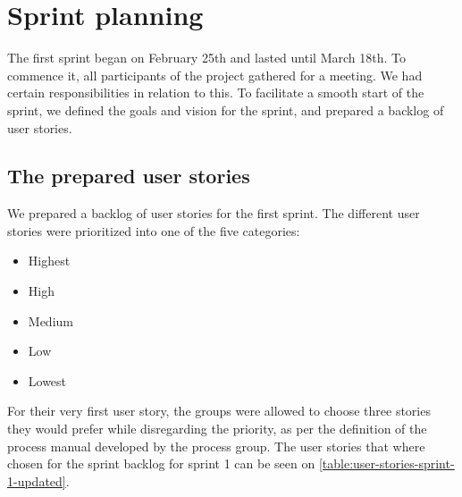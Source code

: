 \section{Sprint planning}\label{sprint-1-planning}
The first sprint began on February 25th and lasted until March 18th.
To commence it, all participants of the project gathered for a meeting.
We had certain responsibilities in relation to this.
To facilitate a smooth start of the sprint, we defined the goals and vision for the sprint, and prepared a backlog of user stories.

\subsection{The prepared user stories}
We prepared a backlog of user stories for the first sprint.
The different user stories were prioritized into one of the five categories:
\begin{itemize}
    \item Highest
    \item High
    \item Medium
    \item Low
    \item Lowest
\end{itemize}
\noindent
For their very first user story, the groups were allowed to choose three stories they would prefer while disregarding the priority, as per the definition of the process manual developed by the process group.
The user stories that where chosen for the sprint backlog for sprint 1 can be seen on \autoref{table:user-stories-sprint-1-updated}.

